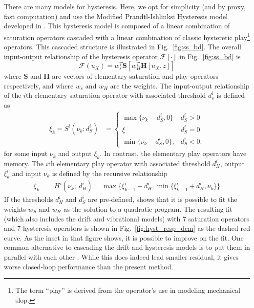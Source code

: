 \documentclass[journal,twocolumn,twoside]{IEEEtran}
\begin{document}
There are many models for hysteresis. Here, we opt for simplicity (and by proxy, fast computation) and use the Modified Prandtl-Ishlinksi Hysteresis model developed in \cite{kuhnen_modeling_2003}. This hysteresis model is composed of a linear combination of saturation operators cascaded with a linear combination of classic hysteretic play\footnote{The term ``play'' is derived from the operator's use in modeling mechanical slop.} operators. This cascaded structure is illustrated in Fig.~\ref{fig:ss_bd}. The overall input-output relationship of the hysteresis operator $\mathcal{F}[\cdot]$ in Fig.~\ref{fig:ss_bd} is
\begin{equation}
  \mathcal{F}(u_X) = w_s^T\mathbf{S}\left[w_H^T \mathbf{H}[u_X, z]\right]
\end{equation}
where $\mathbf{S}$ and $\mathbf{H}$ are vectors of elementary saturation and play operators respectively, and
where $w_s$ and $w_H$ are the weights. The input-output relationship of the $i$th elementary saturation operator with associated threshold $d_s^i$ is defined as
\begin{align}
  \xi_k=
  S^i(\nu_k; d_S^i) &=
  \begin{cases}
    \max\{\nu_k - d_S^i, 0\} & d_S^i >0\\
    \xi & d_S^i = 0\\
    \min\{\nu_k-d_S^i, 0\},  & d_S^i<0.
  \end{cases}
\end{align}
for some input $\nu_k$ and output $\xi_k$. 
In contrast, the elementary play operators have memory. The $i$th elementary play operator with associated threshold $d_H^i$, output $\xi_k^i$ and input $\nu_k$ is defined by the recursive relationship
\begin{align}
  \xi_k &=
  H^i(\nu_k;\: d_H^i) =
  \max\{\xi^i_{k-1}-d_H^i, \min\{\xi^i_{k-1} + d_H^i, \nu_k\} \}
\end{align}
If the thresholds $d_H^i$ and $d_S^i$ are pre-defined, \cite{kuhnen_modeling_2003} shows that it is possible to fit the weights $w_S$ and $w_H$ as the solution to a quadratic program. The resulting fit (which also includes the drift and vibrational models) with 7 saturation operators and 7 hysteresis operators is shown in Fig.~\ref{fig:hyst_resp_dem} as the dashed red curve. As the inset in that figure shows, it is possible to improve on the fit. One common alternative to cascading the drift and hysteresis models is to put them in parallel with each other \cite{mokaberi_compensation_2008, Krejci_inverse_2001}. While this does indeed lead smaller residual, it gives worse closed-loop performance than the present method.
\end{document}
